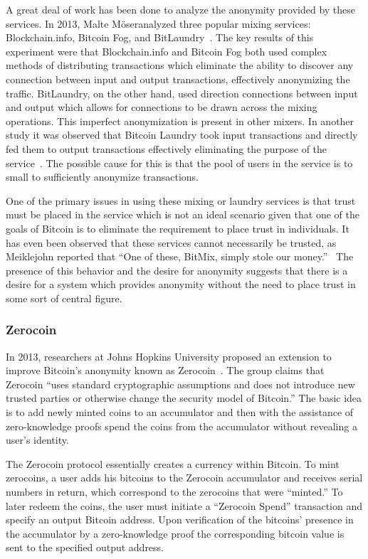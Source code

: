 \documentclass[11pt]{article}
\newcommand{\Moser}{M{\"o}ser}
\begin{document}

A great deal of work has been done to analyze the anonymity provided by these services.
In 2013, Malte \Moser analyzed three popular mixing services: Blockchain.info,
Bitcoin Fog, and BitLaundry~\cite{moser13}. The key results of this experiment
were that Blockchain.info and Bitcoin Fog both used complex methods of
distributing transactions which eliminate the ability to discover any connection
between input and output transactions, effectively anonymizing the traffic.
BitLaundry, on the other hand, used direction connections between input and
output which allows for connections to be drawn across the mixing operations.
This imperfect anonymization is present in other mixers. In another study it
was observed that Bitcoin Laundry took input transactions and directly fed them
to output transactions effectively eliminating the purpose of the
service~\cite{meiklejohn13}. The possible cause for this is that the pool of
users in the service is to small to sufficiently anonymize transactions.

One of the primary issues in using these mixing or laundry services is that
trust must be placed in the service which is not an ideal scenario given that
one of the goals of Bitcoin is to eliminate the requirement to place trust in
individuals. It has even been observed that these services cannot necessarily be
trusted, as Meiklejohn reported that ``One of these, BitMix, simply
stole our money.''~\cite{meiklejohn13} The presence of this behavior and the
desire for anonymity suggests that there is a desire for a system which provides
anonymity without the need to place trust in some sort of central figure.

\subsubsection{Zerocoin}
In 2013, researchers at Johns Hopkins University proposed an extension to
improve Bitcoin's anonymity known as Zerocoin~\cite{miers13}. The group claims
that Zerocoin ``uses standard cryptographic assumptions and does not introduce
new trusted parties or otherwise change the security model of Bitcoin.'' The
basic idea is to add newly minted coins to an accumulator and then with the
assistance of zero-knowledge proofs spend the coins from the accumulator without
revealing a user's identity.

The Zerocoin protocol essentially creates a currency within Bitcoin. To mint
zerocoins, a user adds his bitcoins to the Zerocoin accumulator and receives
serial numbers in return, which correspond to the zerocoins that were ``minted.''
To later redeem the coins, the user must initiate a ``Zerocoin Spend'' transaction
and specify an output Bitcoin address. Upon verification of the bitcoins'
presence in the accumulator by a zero-knowledge proof the
corresponding bitcoin value is sent to the specified output address.
\end{document}
